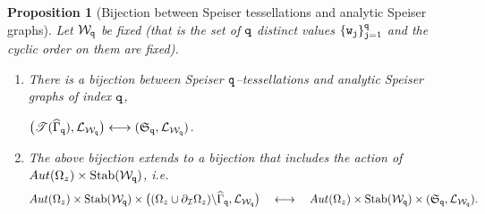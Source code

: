 \documentclass[final,3p,times]{elsarticle}
\newtheorem{proposition}[theorem]{Proposition}
\theoremstyle{definition}
\begin{document}
\begin{proposition}[Bijection between Speiser tessellations and analytic Speiser graphs]
\label{prop:bijection-extends-to-action}
Let $\mathcal{W}_{\tt q}$ be fixed (that is the set of $\tt q$ distinct values 
$\{ {\tt w}_{\tt j} \}_{{\tt j}=1}^{\tt q}$ and the cyclic order on them are fixed).
\begin{enumerate}[label=\arabic*),leftmargin=*]
\item
There is a bijection between Speiser $\tt q$--tessellations and 
analytic Speiser graphs of index ${\tt q}$,

\centerline{$
\big( \mathscr{T}(\widehat{\Gamma}_{\tt q}), 
\mathcal{L}_{\mathcal{W}_{\tt q}} \big) 
\longleftrightarrow 
(\mathfrak{S}_{\tt q}, \mathcal{L}_{\mathcal{W}_{\tt q}} )
$.}

\item
The above bijection extends to a bijection that includes the action of 
$Aut(\Omega_z) \times \text{Stab}(\mathcal{W}_{\tt q})$,
\emph{i.e.}\ 
%
\begin{equation*}
Aut(\Omega_z) \times \text{Stab}(\mathcal{W}_{\tt q}) \times
\big( (\Omega_z \cup \partial_{\mathcal{I}}\Omega_z ) \backslash \widehat{\Gamma}_{\tt q}, 
\mathcal{L}_{\mathcal{W}_{\tt q}} \big) 
\quad
\longleftrightarrow \quad
Aut(\Omega_z) \times \text{Stab}(\mathcal{W}_{\tt q}) \times
(\mathfrak{S}_{\tt q}, \mathcal{L}_{\mathcal{W}_{\tt q}} ).
\end{equation*}
\end{enumerate}
\end{proposition}
\end{document}
